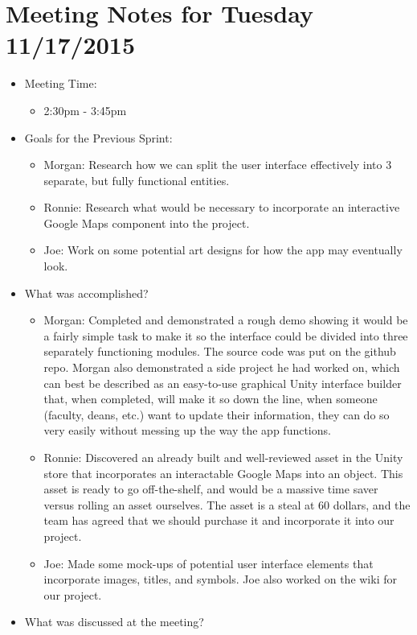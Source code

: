 \documentclass[]{article}
\begin{document}
	\section{Meeting Notes for Tuesday 11/17/2015}
	\begin{itemize}
		\item Meeting Time:
		\begin{itemize}
			\item 2:30pm - 3:45pm
		\end{itemize}
		\item Goals for the Previous Sprint:
		\begin{itemize}
			\item Morgan: Research how we can split the user interface effectively into 3 separate, but fully functional entities.
			\item Ronnie: Research what would be necessary to incorporate an interactive Google Maps component into the project. 
			\item Joe: Work on some potential art designs for how the app may eventually look. 
		\end{itemize}
		\item What was accomplished?
		\begin{itemize}
			\item Morgan: Completed and demonstrated a rough demo showing it would be a fairly simple task to make it so the interface could be divided into three separately functioning modules. The source code was put on the github repo. Morgan also demonstrated a side project he had worked on, which can best be described as an easy-to-use graphical Unity interface builder that, when completed, will make it so down the line, when someone (faculty, deans, etc.) want to update their information, they can do so very easily without messing up the way the app functions. 
			\item Ronnie: Discovered an already built and well-reviewed asset in the Unity store that incorporates an interactable Google Maps into an object. This asset is ready to go off-the-shelf, and would be a massive time saver versus rolling an asset ourselves. The asset is a steal at 60 dollars, and the team has agreed that we should purchase it and incorporate it into our project. 
			\item Joe: Made some mock-ups of potential user interface elements that incorporate images, titles, and symbols. Joe also worked on the wiki for our project. 
		\end{itemize}
			\item What was discussed at the meeting?

\end{itemize}
\end{document}
